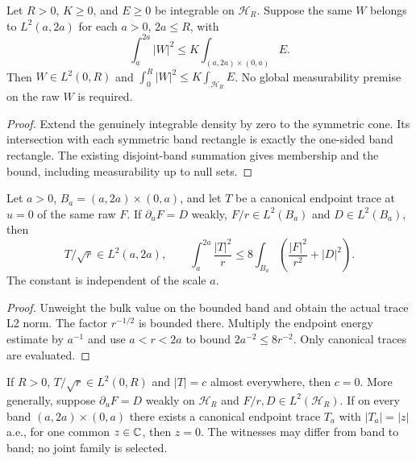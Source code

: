 \begin{lemma}
\label{lem:half-cone-band-energy}
\leanok
Let $R>0$, $K\ge0$, and $E\ge0$ be integrable on $\mathcal H_R$.
Suppose the same $W$ belongs to $L^2(a,2a)$ for each $a>0$, $2a\le R$,
with
\[
 \int_a^{2a}|W|^2
 \le K\int_{(a,2a)\times(0,a)}E.
\]
Then $W\in L^2(0,R)$ and
$\int_0^R|W|^2\le K\int_{\mathcal H_R}E$.
No global measurability premise on the raw $W$ is required.
\end{lemma}

\begin{proof}
\leanok
Extend the genuinely integrable density by zero to the symmetric cone.
Its intersection with each symmetric band rectangle is exactly the one-sided
band rectangle. The existing disjoint-band summation gives membership
and the bound, including measurability up to null sets.
\end{proof}

\begin{lemma}
\label{lem:boundary-weighted-band-trace}
\leanok
Let $a>0$, $B_a=(a,2a)\times(0,a)$, and let $T$ be a canonical endpoint
trace at $u=0$ of the same raw $F$.
If $\partial_uF=D$ weakly, $F/r\in L^2(B_a)$ and $D\in L^2(B_a)$, then
\[
 T/\sqrt r\in L^2(a,2a),\qquad
 \int_a^{2a}\frac{|T|^2}{r}
 \le8\int_{B_a}\left(\frac{|F|^2}{r^2}+|D|^2\right).
\]
The constant is independent of the scale $a$.
\end{lemma}

\begin{proof}
\leanok
Unweight the bulk value on the bounded band and obtain the actual trace L2 norm.
The factor $r^{-1/2}$ is bounded there. Multiply the endpoint energy estimate
by $a^{-1}$ and use $a<r<2a$ to bound $2a^{-2}\le8r^{-2}$.
Only canonical traces are evaluated.
\end{proof}

\begin{lemma}
\label{lem:critical-boundary-mode}
\leanok
If $R>0$, $T/\sqrt r\in L^2(0,R)$ and $|T|=c$ almost everywhere,
then $c=0$.
More generally, suppose $\partial_uF=D$ weakly on $\mathcal H_R$ and
$F/r,D\in L^2(\mathcal H_R)$.
If on every band $(a,2a)\times(0,a)$ there exists a canonical endpoint trace
$T_a$ with $|T_a|=|z|$ a.e., for one common $z\in\mathbb{C}$, then $z=0$.
The witnesses may differ from band to band; no joint family is selected.
\end{lemma}

